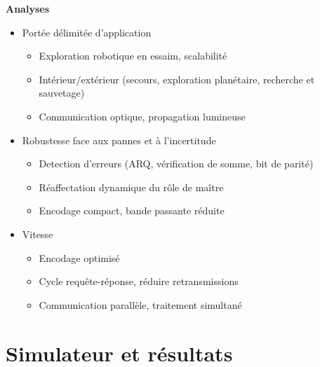 \documentclass[aspectratio=169,10pt]{beamer}
\begin{document}
\begin{frame}{\textbf{Analyses}}
	\begin{itemize}
		\item{Portée délimitée d'application}
		\begin{itemize}
			\item Exploration robotique en essaim, scalabilité
			\item Intérieur/extérieur (secours, exploration planétaire, recherche et sauvetage)
			\item Communication optique, propagation lumineuse
		\end{itemize}
		
		\vspace{0.2cm}
		\item{Robustesse face aux pannes et à l'incertitude}
		\begin{itemize}
			\item Detection d'erreurs (ARQ, vérification de somme, bit de parité)
			\item Réaffectation dynamique du rôle de maître
			\item Encodage compact, bande passante réduite
		\end{itemize}
		
		\vspace{0.2cm}
		\item{Vitesse}
		\begin{itemize}
			\item Encodage optimisé
			\item Cycle requête-réponse, réduire retransmissions
			\item Communication parallèle, traitement simultané
		\end{itemize}
	\end{itemize}
\end{frame}

\section{Simulateur et résultats}
\end{document}
